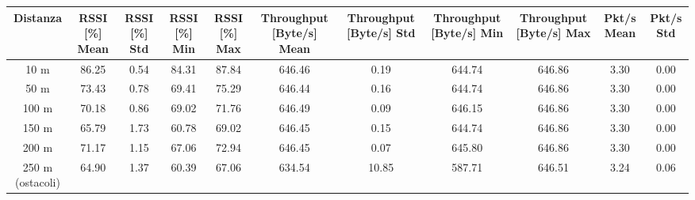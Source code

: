 \documentclass[12pt,a4paper,twoside]{book}
\begin{document}
\ifdefined\HCode
    \begin{table}[H]
        \centering
        \renewcommand{\arraystretch}{1.2}
        \begin{tabular}{|c|c|c|c|c|c|c|c|c|c|c|}
            \hline
            \textbf{Distanza} & \textbf{RSSI [\%] Mean} & \textbf{RSSI [\%] Std} & \textbf{RSSI [\%] Min} & \textbf{RSSI [\%] Max} & \textbf{Throughput [Byte/s] Mean} & \textbf{Throughput [Byte/s] Std} & \textbf{Throughput [Byte/s] Min} & \textbf{Throughput [Byte/s] Max} & \textbf{Pkt/s Mean} & \textbf{Pkt/s Std} \\
            \hline
            10 m              & 86.25                   & 0.54                   & 84.31                  & 87.84                  & 646.46                            & 0.19                             & 644.74                           & 646.86                           & 3.30                & 0.00               \\ \hline
            50 m              & 73.43                   & 0.78                   & 69.41                  & 75.29                  & 646.44                            & 0.16                             & 644.74                           & 646.86                           & 3.30                & 0.00               \\ \hline
            100 m             & 70.18                   & 0.86                   & 69.02                  & 71.76                  & 646.49                            & 0.09                             & 646.15                           & 646.86                           & 3.30                & 0.00               \\ \hline
            150 m             & 65.79                   & 1.73                   & 60.78                  & 69.02                  & 646.45                            & 0.15                             & 644.74                           & 646.86                           & 3.30                & 0.00               \\ \hline
            200 m             & 71.17                   & 1.15                   & 67.06                  & 72.94                  & 646.45                            & 0.07                             & 645.80                           & 646.86                           & 3.30                & 0.00               \\ \hline
            250 m (ostacoli)  & 64.90                   & 1.37                   & 60.39                  & 67.06                  & 634.54                            & 10.85                            & 587.71                           & 646.51                           & 3.24                & 0.06               \\ \hline

\end{tabular}
\end{table}
\end{document}
